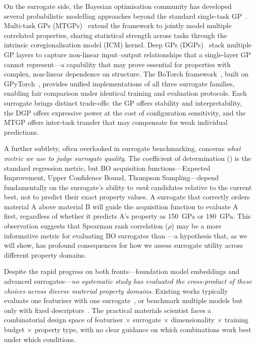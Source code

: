 On the surrogate side, the Bayesian optimisation community has developed several probabilistic modelling approaches beyond the standard single-task GP~\cite{rasmussen2006gaussian}.
Multi-task GPs (MTGPs)~\cite{bonilla2007multi,swersky2013multi} extend the framework to jointly model multiple correlated properties, sharing statistical strength across tasks through the intrinsic coregionalisation model (ICM) kernel.
Deep GPs (DGPs)~\cite{damianou2013deep,dutordoir2021deep} stack multiple GP layers to capture non-linear input--output relationships that a single-layer GP cannot represent---a capability that may prove essential for properties with complex, non-linear dependence on structure.
The BoTorch framework~\cite{balandat2020botorch}, built on GPyTorch~\cite{gardner2018gpytorch}, provides unified implementations of all three surrogate families, enabling fair comparison under identical training and evaluation protocols.
Each surrogate brings distinct trade-offs: the GP offers stability and interpretability, the DGP offers expressive power at the cost of configuration sensitivity, and the MTGP offers inter-task transfer that may compensate for weak individual predictions.

A further subtlety, often overlooked in surrogate benchmarking, concerns \emph{what metric we use to judge surrogate quality}.
The coefficient of determination (\Rtwo{}) is the standard regression metric, but BO acquisition functions---Expected Improvement, Upper Confidence Bound, Thompson Sampling---depend fundamentally on the surrogate's ability to \emph{rank} candidates relative to the current best, not to predict their exact property values.
A surrogate that correctly orders material A above material B will guide the acquisition function to evaluate A first, regardless of whether it predicts A's property as 150~GPa or 180~GPa.
This observation suggests that Spearman rank correlation ($\rho$) may be a more informative metric for evaluating BO surrogates than \Rtwo{}---a hypothesis that, as we will show, has profound consequences for how we assess surrogate utility across different property domains.

Despite the rapid progress on both fronts---foundation model embeddings and advanced surrogates---\emph{no systematic study has evaluated the cross-product of these choices across diverse material property domains}.
Existing works typically evaluate one featuriser with one surrogate~\cite{batatia2024foundation}, or benchmark multiple models but only with fixed descriptors~\cite{dunn2020benchmarking}.
The practical materials scientist faces a combinatorial design space of featuriser $\times$ surrogate $\times$ dimensionality $\times$ training budget $\times$ property type, with no clear guidance on which combinations work best under which conditions.

